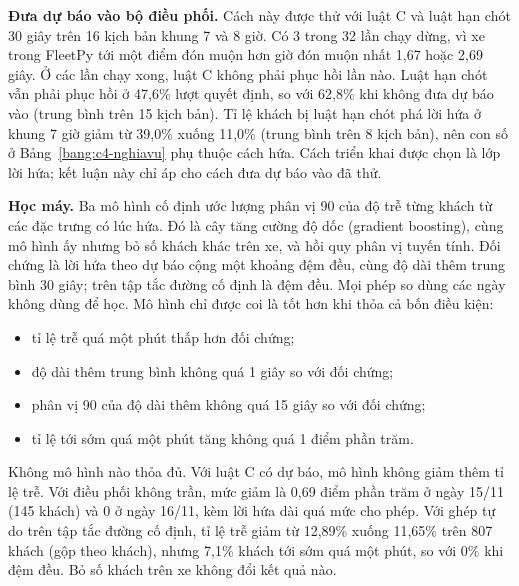 \textbf{Đưa dự báo vào bộ điều phối.} Cách này được thử với luật C và luật hạn chót 30 giây trên 16 kịch bản khung 7
và 8 giờ. Có 3 trong 32 lần chạy dừng, vì xe trong FleetPy tới một điểm đón muộn hơn giờ đón muộn nhất 1,67 hoặc
2,69 giây. Ở các lần chạy xong, luật C không phải phục hồi lần nào. Luật hạn chót vẫn phải phục hồi ở 47,6\% lượt
quyết định, so với 62,8\% khi không đưa dự báo vào (trung bình trên 15 kịch bản). Tỉ lệ khách bị luật hạn chót phá
lời hứa ở khung 7 giờ giảm từ 39,0\% xuống 11,0\% (trung bình trên 8 kịch bản), nên con số ở
Bảng~\ref{bang:c4-nghiavu} phụ thuộc cách hứa. Cách triển khai được chọn là lớp lời hứa; kết luận này chỉ áp cho cách
đưa dự báo vào đã thử.

\textbf{Học máy.} Ba mô hình cố định ước lượng phân vị 90 của độ trễ từng khách từ các đặc trưng có lúc hứa. Đó là
cây tăng cường độ dốc (gradient boosting), cùng mô hình ấy nhưng bỏ số khách khác trên xe, và hồi quy phân vị tuyến
tính. Đối chứng là lời hứa theo dự báo cộng một khoảng đệm đều, cùng độ dài thêm trung bình 30 giây; trên tập tắc
đường cố định là đệm đều. Mọi phép so dùng các ngày không dùng để học. Mô hình chỉ được coi là tốt hơn khi thỏa cả bốn
điều kiện:
\begin{itemize}[leftmargin=1.2cm,itemsep=0pt,topsep=2pt]
\item tỉ lệ trễ quá một phút thấp hơn đối chứng;
\item độ dài thêm trung bình không quá 1 giây so với đối chứng;
\item phân vị 90 của độ dài thêm không quá 15 giây so với đối chứng;
\item tỉ lệ tới sớm quá một phút tăng không quá 1 điểm phần trăm.
\end{itemize}

Không mô hình nào thỏa đủ. Với luật C có dự báo, mô hình không giảm thêm tỉ lệ trễ. Với điều phối không trần, mức
giảm là 0,69 điểm phần trăm ở ngày 15/11 (145 khách) và 0 ở ngày 16/11, kèm lời hứa dài quá mức cho phép. Với ghép
tự do trên tập tắc đường cố định, tỉ lệ trễ giảm từ 12,89\% xuống 11,65\% trên 807 khách (gộp theo khách), nhưng
7,1\% khách tới sớm quá một phút, so với 0\% khi đệm đều. Bỏ số khách trên xe không đổi kết quả nào.

